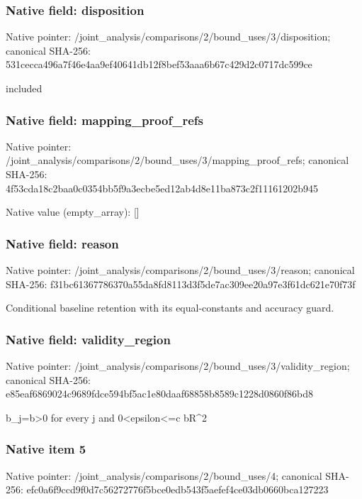 \documentclass[10pt,a4paper]{article}
\begin{document}
\subsubsection{Native field: disposition}
Native pointer: /joint\_\allowbreak{}analysis/comparisons/2/bound\_\allowbreak{}uses/3/disposition; canonical SHA-256: 531cecca496a7f46e4aa9ef40641db12f8bef53aaa6b67c429d2c0717dc599ce

\begingroup\raggedright\sloppy included\par\endgroup

\subsubsection{Native field: mapping\_\allowbreak{}proof\_\allowbreak{}refs}
Native pointer: /joint\_\allowbreak{}analysis/comparisons/2/bound\_\allowbreak{}uses/3/mapping\_\allowbreak{}proof\_\allowbreak{}refs; canonical SHA-256: 4f53cda18c2baa0c0354bb5f9a3ecbe5ed12ab4d8e11ba873c2f11161202b945

Native value (empty\_\allowbreak{}array): []

\subsubsection{Native field: reason}
Native pointer: /joint\_\allowbreak{}analysis/comparisons/2/bound\_\allowbreak{}uses/3/reason; canonical SHA-256: f31bc61367786370a55da8fd8113d3f5de7ac309ee20a97e3f61dc621e70f73f

\begingroup\raggedright\sloppy Conditional baseline retention with its equal-constants and accuracy guard.\par\endgroup

\subsubsection{Native field: validity\_\allowbreak{}region}
Native pointer: /joint\_\allowbreak{}analysis/comparisons/2/bound\_\allowbreak{}uses/3/validity\_\allowbreak{}region; canonical SHA-256: e85eaf6869024c9689fdce594bf5ac1e80daaf68858b8589c1228d0860f86bd8

\begingroup\raggedright\sloppy b\_\allowbreak{}j=\allowbreak{}b>0 for every j and 0<epsilon<=\allowbreak{}c bR\textasciicircum{}2\par\endgroup

\subsubsection{Native item 5}
Native pointer: /joint\_\allowbreak{}analysis/comparisons/2/bound\_\allowbreak{}uses/4; canonical SHA-256: efc0a6f9ccd9f0d7c56272776f5bce0edb543f5aefef4ce03db0660bca127223
\end{document}
